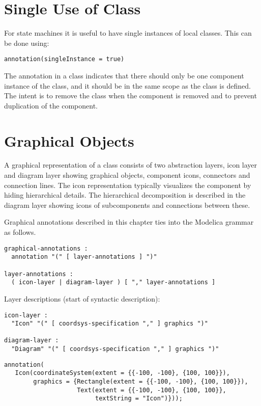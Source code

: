\section{Single Use of Class}\label{annotation-for-single-use-of-class}\label{single-use-of-class}

For state machines it is useful to have single instances of local classes.
This can be done using:
\begin{lstlisting}[language=modelica]
annotation(singleInstance = true)
\end{lstlisting}

The annotation  in a class indicates that there should only be one component instance of the class, and it should be in the same scope as the class is defined.
The intent is to remove the class when the component is removed and to prevent duplication of the component.


\section{Graphical Objects}\label{annotations-for-graphical-objects}\label{graphical-objects}

A graphical representation of a class consists of two abstraction
layers, icon layer and diagram layer showing graphical objects,
component icons, connectors and connection lines. The icon
representation typically visualizes the component by hiding hierarchical
details. The hierarchical decomposition is described in the diagram
layer showing icons of subcomponents and connections between these.

Graphical annotations described in this chapter ties into the Modelica
grammar as follows.
\begin{lstlisting}[language=grammar]
graphical-annotations :
  annotation "(" [ layer-annotations ] ")"

layer-annotations :
  ( icon-layer | diagram-layer ) [ "," layer-annotations ]
\end{lstlisting}
Layer descriptions (start of syntactic description):
\begin{lstlisting}[language=grammar]
icon-layer :
  "Icon" "(" [ coordsys-specification "," ] graphics ")"

diagram-layer :
  "Diagram" "(" [ coordsys-specification "," ] graphics ")"
\end{lstlisting}%

\begin{example}
\begin{lstlisting}[language=modelica]
annotation(
   Icon(coordinateSystem(extent = {{-100, -100}, {100, 100}}),
        graphics = {Rectangle(extent = {{-100, -100}, {100, 100}}),
                    Text(extent = {{-100, -100}, {100, 100}},
                         textString = "Icon")}));
\end{lstlisting}
\end{example}

